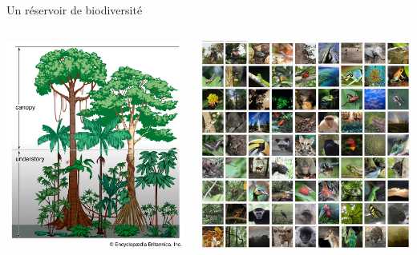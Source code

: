 \documentclass[10pt,table,dvipsnames,compress]{beamer}
\begin{document}
\begin{frame}[label={sec:org7f62daa}]{Un réservoir de biodiversité}
\begin{columns}
\begin{column}{0.5\columnwidth}
\begin{center}
\includegraphics[width=\textwidth]{figs/vegetation-profile-rainforest.png}
\end{center}
\end{column}
\begin{column}{0.5\columnwidth}
\begin{center}
\includegraphics[width=\textwidth]{figs/biodiversity-in-tropical-forests.jpg}

\end{center}
\end{column}
\end{columns}
\end{frame}
\end{document}
